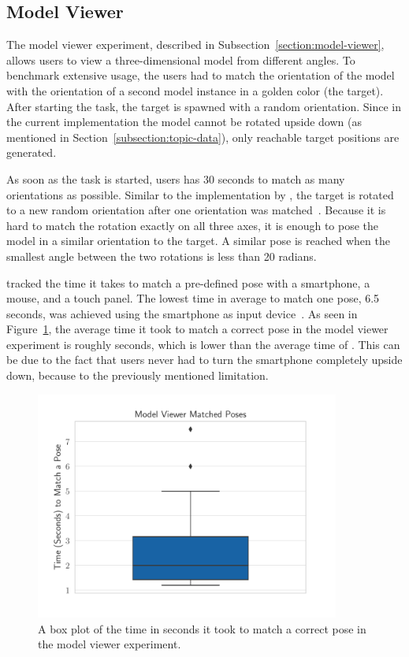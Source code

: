 \subsection{Model Viewer}\label{section:eval-res-mv}

The model viewer experiment, described in Subsection~\ref{section:model-viewer}, allows users to view a three-dimensional model from different angles. To benchmark extensive usage, the users had to match the orientation of the model with the orientation of a second model instance in a golden color (the target). After starting the task, the target is spawned with a random orientation.
Since in the current implementation the model cannot be rotated upside down (as mentioned in Section~\ref{subsection:topic-data}), only reachable target positions are generated.

As soon as the task is started, users has 30 seconds to match as many orientations as possible. Similar to the implementation by \citeauthor{Katzakis.2010}, the target is rotated to a new random orientation after one orientation was matched~\cite[140]{Katzakis.2010}.
Because it is hard to match the rotation exactly on all three axes, it is enough to pose the model in a similar orientation to the target. A similar pose is reached when the smallest angle between the two rotations is less than 20 radians.

\citeauthor{Katzakis.2010} tracked the time it takes to match a pre-defined pose with a smartphone, a mouse, and a touch panel. The lowest time in average to match one pose, 6.5 seconds, was achieved using the smartphone as input device~\cite[140]{Katzakis.2010}. As seen in Figure~\ref{fig:eval-exp-mv}, the average time it took to match a correct pose in the model viewer experiment is roughly \evalExpMvAvgPoses{} seconds, which is lower than the average time of \citeauthor{Katzakis.2010}. This can be due to the fact that users never had to turn the smartphone completely upside down, because to the previously mentioned limitation.

\begin{figure}[H]
	\centering
	\includegraphics[width=10cm]{figures/evaluation/eval_exp_mv.pdf}
	\caption[Model viewer task results]{A box plot of the time in seconds it took to match a correct pose in the model viewer experiment.}\label{fig:eval-exp-mv}
\end{figure}

